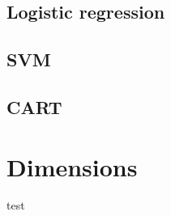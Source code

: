 \documentclass[a4paper,draft=false]{scrreprt}
\begin{document}
\section{Logistic regression} %
\section{SVM} %
\section{CART} %



\chapter{Dimensions}

test

\appendix
\appendixpage
\end{document}
